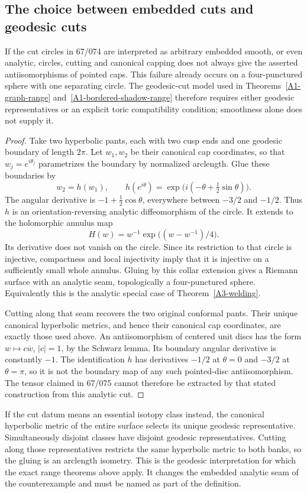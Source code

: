 \subsection{The choice between embedded cuts and geodesic cuts}
\label{sec:A1-cut-choice}

\begin{proposition}
\label{A1-nontoric-cut}
If the cut circles in 67/074 are interpreted as arbitrary embedded
smooth, or even analytic, circles, cutting and canonical capping
does not always give the asserted antiisomorphisms of pointed caps.
This failure already occurs on a four-punctured sphere with one
separating circle. The geodesic-cut model used in
Theorems~\ref{A1-graph-range} and~\ref{A1-bordered-shadow-range}
therefore requires either geodesic representatives or an explicit
toric compatibility condition; smoothness alone does not supply it.
\end{proposition}
\begin{proof}
Take two hyperbolic pants, each with two cusp ends and one
geodesic boundary of length $2\pi$. Let $w_1,w_2$ be their canonical
cap coordinates, so that $w_j=e^{i\theta_j}$ parametrizes the
boundary by normalized arclength. Glue these boundaries by
\[
 w_2=h(w_1),\qquad
 h(e^{i\theta})=
       \exp\bigl(i(-\theta+\tfrac12\sin\theta)\bigr).
\]
The angular derivative is $-1+\tfrac12\cos\theta$, everywhere
between $-3/2$ and $-1/2$. Thus $h$ is an orientation-reversing
analytic diffeomorphism of the circle. It extends to the holomorphic
annulus map
\[
 H(w)=w^{-1}\exp\bigl((w-w^{-1})/4\bigr).
\]
Its derivative does not vanish on the circle. Since its restriction
to that circle is injective, compactness and local injectivity imply
that it is injective on a sufficiently small whole annulus. Gluing by
this collar extension gives a Riemann surface with an analytic
seam, topologically a four-punctured sphere. Equivalently this
is the analytic special case of Theorem~\ref{A3-welding}.

Cutting along that seam recovers the two original conformal
pants. Their unique canonical hyperbolic metrics, and hence their
canonical cap coordinates, are exactly those used above. An
antiisomorphism of centered unit discs has the form
$w\mapsto c\overline w$, $|c|=1$, by the Schwarz lemma. Its boundary
angular derivative is constantly $-1$. The identification $h$
has derivatives $-1/2$ at $\theta=0$ and $-3/2$ at $\theta=\pi$,
so it is not the boundary map of any such pointed-disc
antiisomorphism. The tensor claimed in 67/075 cannot therefore
be extracted by that stated construction from this analytic cut.
\end{proof}

If the cut datum means an essential isotopy class instead, the
canonical hyperbolic metric of the entire surface selects its
unique geodesic representative. Simultaneously disjoint classes
have disjoint geodesic representatives. Cutting along those
representatives restricts the same hyperbolic metric to both
banks, so the gluing is an arclength isometry. This is the
geodesic interpretation for which the exact range theorems
above apply. It changes the embedded analytic seam of the
counterexample and must be named as part of the definition.
